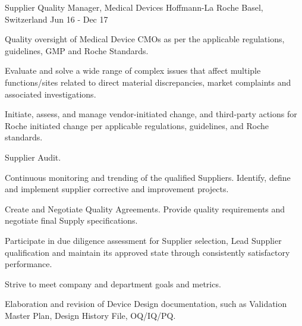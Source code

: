 \begin{cventries}
\cventry
    {Supplier Quality Manager, Medical Devices} %
    {Hoffmann-La Roche} %
    {Basel, Switzerland} %
    {Jun 16 - Dec 17} %
    {
        \begin{cvitems} %
            \item {Quality oversight of Medical Device CMOs as per the applicable regulations, guidelines, GMP and Roche Standards.}
            \item {Evaluate and solve a wide range of complex issues that affect multiple functions/sites related to direct material discrepancies, market complaints and associated investigations.}
            \item {Initiate, assess, and manage vendor-initiated change, and third-party actions for Roche initiated change per applicable regulations, guidelines, and Roche standards.}
            \item {Supplier Audit.}
            \item {Continuous monitoring and trending of the qualified Suppliers. Identify, define and implement supplier corrective and improvement projects.}
            \item {Create and Negotiate Quality Agreements. Provide quality requirements and negotiate final Supply specifications.}
            \item {Participate in due diligence assessment for Supplier selection, Lead Supplier qualification and maintain its approved state through consistently satisfactory performance.}
            \item {Strive to meet company and department goals and metrics.}
            \item {Elaboration and revision of Device Design documentation, such as Validation Master Plan, Design History File, OQ/IQ/PQ.}
        \end{cvitems}
    }


\end{cventries}
